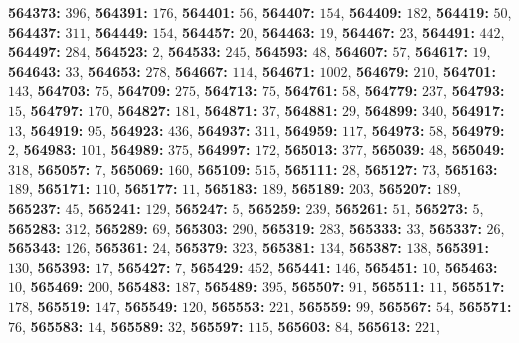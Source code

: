 \textsf{\bfseries 564373:} $396$, \textsf{\bfseries 564391:} $176$, \textsf{\bfseries 564401:} $56$, \textsf{\bfseries 564407:} $154$, \textsf{\bfseries 564409:} $182$, \textsf{\bfseries 564419:} $50$, \textsf{\bfseries 564437:} $311$, \textsf{\bfseries 564449:} $154$, \textsf{\bfseries 564457:} $20$, \textsf{\bfseries 564463:} $19$, \textsf{\bfseries 564467:} $23$, \textsf{\bfseries 564491:} $442$, \textsf{\bfseries 564497:} $284$, \textsf{\bfseries 564523:} $2$, \textsf{\bfseries 564533:} $245$, \textsf{\bfseries 564593:} $48$, \textsf{\bfseries 564607:} $57$, \textsf{\bfseries 564617:} $19$, \textsf{\bfseries 564643:} $33$, \textsf{\bfseries 564653:} $278$, \textsf{\bfseries 564667:} $114$, \textsf{\bfseries 564671:} $1002$, \textsf{\bfseries 564679:} $210$, \textsf{\bfseries 564701:} $143$, \textsf{\bfseries 564703:} $75$, \textsf{\bfseries 564709:} $275$, \textsf{\bfseries 564713:} $75$, \textsf{\bfseries 564761:} $58$, \textsf{\bfseries 564779:} $237$, \textsf{\bfseries 564793:} $15$, \textsf{\bfseries 564797:} $170$, \textsf{\bfseries 564827:} $181$, \textsf{\bfseries 564871:} $37$, \textsf{\bfseries 564881:} $29$, \textsf{\bfseries 564899:} $340$, \textsf{\bfseries 564917:} $13$, \textsf{\bfseries 564919:} $95$, \textsf{\bfseries 564923:} $436$, \textsf{\bfseries 564937:} $311$, \textsf{\bfseries 564959:} $117$, \textsf{\bfseries 564973:} $58$, \textsf{\bfseries 564979:} $2$, \textsf{\bfseries 564983:} $101$, \textsf{\bfseries 564989:} $375$, \textsf{\bfseries 564997:} $172$, \textsf{\bfseries 565013:} $377$, \textsf{\bfseries 565039:} $48$, \textsf{\bfseries 565049:} $318$, \textsf{\bfseries 565057:} $7$, \textsf{\bfseries 565069:} $160$, \textsf{\bfseries 565109:} $515$, \textsf{\bfseries 565111:} $28$, \textsf{\bfseries 565127:} $73$, \textsf{\bfseries 565163:} $189$, \textsf{\bfseries 565171:} $110$, \textsf{\bfseries 565177:} $11$, \textsf{\bfseries 565183:} $189$, \textsf{\bfseries 565189:} $203$, \textsf{\bfseries 565207:} $189$, \textsf{\bfseries 565237:} $45$, \textsf{\bfseries 565241:} $129$, \textsf{\bfseries 565247:} $5$, \textsf{\bfseries 565259:} $239$, \textsf{\bfseries 565261:} $51$, \textsf{\bfseries 565273:} $5$, \textsf{\bfseries 565283:} $312$, \textsf{\bfseries 565289:} $69$, \textsf{\bfseries 565303:} $290$, \textsf{\bfseries 565319:} $283$, \textsf{\bfseries 565333:} $33$, \textsf{\bfseries 565337:} $26$, \textsf{\bfseries 565343:} $126$, \textsf{\bfseries 565361:} $24$, \textsf{\bfseries 565379:} $323$, \textsf{\bfseries 565381:} $134$, \textsf{\bfseries 565387:} $138$, \textsf{\bfseries 565391:} $130$, \textsf{\bfseries 565393:} $17$, \textsf{\bfseries 565427:} $7$, \textsf{\bfseries 565429:} $452$, \textsf{\bfseries 565441:} $146$, \textsf{\bfseries 565451:} $10$, \textsf{\bfseries 565463:} $10$, \textsf{\bfseries 565469:} $200$, \textsf{\bfseries 565483:} $187$, \textsf{\bfseries 565489:} $395$, \textsf{\bfseries 565507:} $91$, \textsf{\bfseries 565511:} $11$, \textsf{\bfseries 565517:} $178$, \textsf{\bfseries 565519:} $147$, \textsf{\bfseries 565549:} $120$, \textsf{\bfseries 565553:} $221$, \textsf{\bfseries 565559:} $99$, \textsf{\bfseries 565567:} $54$, \textsf{\bfseries 565571:} $76$, \textsf{\bfseries 565583:} $14$, \textsf{\bfseries 565589:} $32$, \textsf{\bfseries 565597:} $115$, \textsf{\bfseries 565603:} $84$, \textsf{\bfseries 565613:} $221$, 
